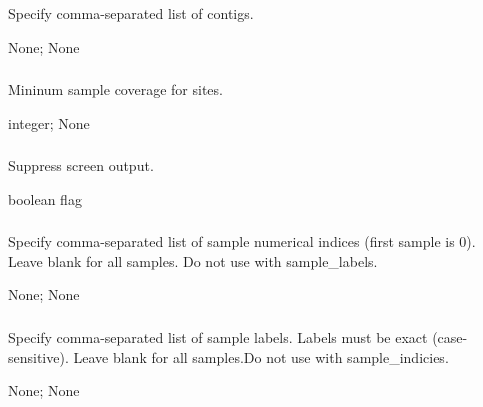 \documentclass[letterpaper,11pt,english]{sphinxmanual}
\begin{document}
\subsubsection{}
\label{\detokenize{prog_desc:id47}}
 Specify comma-separated list of contigs.

 None;  None


\subsubsection{}
\label{\detokenize{prog_desc:mincoverage}}
 Mininum sample coverage for sites.

 integer;  None


\subsubsection{}
\label{\detokenize{prog_desc:id48}}
 Suppress screen output.

 boolean flag


\subsubsection{}
\label{\detokenize{prog_desc:sample-indices-sampleindices}}
 Specify comma-separated list of sample numerical indices (first sample is 0). Leave blank for all samples. Do not use with \textendash{}sample\_labels.

 None;  None


\subsubsection{}
\label{\detokenize{prog_desc:sample-labels}}
 Specify comma-separated list of sample labels. Labels must be exact (case-sensitive). Leave blank for all samples.Do not use with \textendash{}sample\_indicies.

 None;  None
\end{document}
